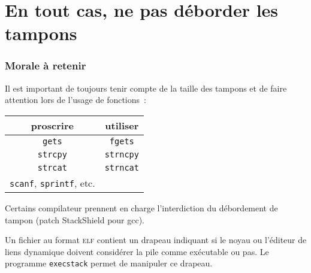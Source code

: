 \section{En tout cas, ne pas d\'eborder les tampons}
\begin{frame}[fragile]
  \frametitle{Morale \`a retenir}%
  Il est important de toujours tenir compte de la taille des tampons et
  de faire attention lors de l'usage de fonctions~:
  \begin{center}
    \begin{tabular}{c|c}
      proscrire & utiliser \\ \hline
   \verb?gets? & 
   \verb?fgets?
      \\
   \verb?strcpy? &
   \verb?strncpy?
      \\
   \verb?strcat? &
   \verb?strncat?
      \\
    \verb+scanf+, \verb+sprintf+, etc.  &
    \end{tabular}
  \end{center}
  Certains compilateur prennent en charge l'interdiction du
  d\'ebordement de tampon (patch StackShield pour gcc).
  \par\bigskip
  Un fichier au format \textsc{elf} contient un drapeau indiquant si
  le noyau ou l'\'editeur de liens dynamique doivent consid\'erer la
  pile comme ex\'ecutable ou pas. Le programme \texttt{execstack}
  permet de manipuler ce drapeau.
\end{frame}

